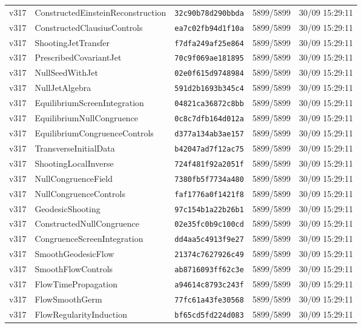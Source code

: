 \documentclass[11pt]{article}
\theoremstyle{definition}\newtheorem{deriv}{Derivation}
\begin{document}
{\begin{longtable}{@{}lllll@{}}
v317 & ConstructedEinsteinReconstruction & \texttt{32c90b78d290bbda} & 5899/5899 & 30/09 15:29:11 \\
v317 & ConstructedClausiusControls & \texttt{ea7c02fb94d1f10a} & 5899/5899 & 30/09 15:29:11 \\
v317 & ShootingJetTransfer & \texttt{f7dfa249af25e864} & 5899/5899 & 30/09 15:29:11 \\
v317 & PrescribedCovariantJet & \texttt{70c9f069ae181895} & 5899/5899 & 30/09 15:29:11 \\
v317 & NullSeedWithJet & \texttt{02e0f615d9748984} & 5899/5899 & 30/09 15:29:11 \\
v317 & NullJetAlgebra & \texttt{591d2b1693b345c4} & 5899/5899 & 30/09 15:29:11 \\
v317 & EquilibriumScreenIntegration & \texttt{04821ca36872c8bb} & 5899/5899 & 30/09 15:29:11 \\
v317 & EquilibriumNullCongruence & \texttt{0c8c7dfb164d012a} & 5899/5899 & 30/09 15:29:11 \\
v317 & EquilibriumCongruenceControls & \texttt{d377a134ab3ae157} & 5899/5899 & 30/09 15:29:11 \\
v317 & TransverseInitialData & \texttt{b42047ad7f12ac75} & 5899/5899 & 30/09 15:29:11 \\
v317 & ShootingLocalInverse & \texttt{724f481f92a2051f} & 5899/5899 & 30/09 15:29:11 \\
v317 & NullCongruenceField & \texttt{7380fb5f7734a480} & 5899/5899 & 30/09 15:29:11 \\
v317 & NullCongruenceControls & \texttt{faf1776a0f1421f8} & 5899/5899 & 30/09 15:29:11 \\
v317 & GeodesicShooting & \texttt{97c154b1a22b26b1} & 5899/5899 & 30/09 15:29:11 \\
v317 & ConstructedNullCongruence & \texttt{02e35fc0b9c100cd} & 5899/5899 & 30/09 15:29:11 \\
v317 & CongruenceScreenIntegration & \texttt{dd4aa5c4913f9e27} & 5899/5899 & 30/09 15:29:11 \\
v317 & SmoothGeodesicFlow & \texttt{21374c7627926c49} & 5899/5899 & 30/09 15:29:11 \\
v317 & SmoothFlowControls & \texttt{ab8716093ff62c3e} & 5899/5899 & 30/09 15:29:11 \\
v317 & FlowTimePropagation & \texttt{a94614c8793c243f} & 5899/5899 & 30/09 15:29:11 \\
v317 & FlowSmoothGerm & \texttt{77fc61a43fe30568} & 5899/5899 & 30/09 15:29:11 \\
v317 & FlowRegularityInduction & \texttt{bf65cd5fd224d083} & 5899/5899 & 30/09 15:29:11 \\

\end{longtable}}
\end{document}
